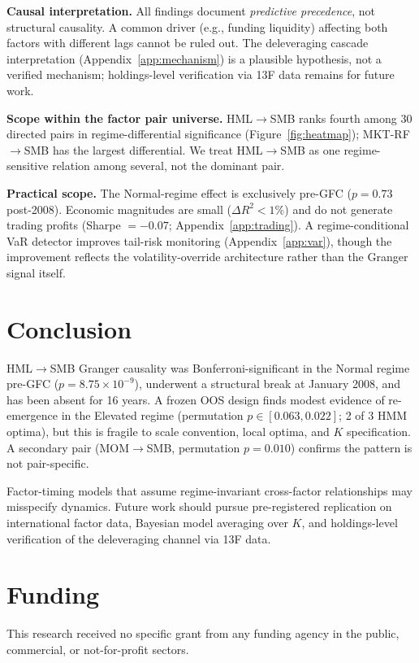 \documentclass[sigconf,anonymous]{acmart}
\begin{document}
\textbf{Causal interpretation.}
All findings document \emph{predictive precedence}, not structural causality.
A common driver (e.g., funding liquidity) affecting both factors with different
lags cannot be ruled out. The deleveraging cascade interpretation
(Appendix~\ref{app:mechanism}) is a plausible hypothesis, not a verified mechanism;
holdings-level verification via 13F data remains for future work.

\textbf{Scope within the factor pair universe.}
HML$\to$SMB ranks fourth among 30 directed pairs in regime-differential
significance (Figure~\ref{fig:heatmap}); MKT-RF$\to$SMB has the largest
differential. We treat HML$\to$SMB as one regime-sensitive relation among several,
not the dominant pair.

\textbf{Practical scope.}
The Normal-regime effect is exclusively pre-GFC ($p = 0.73$ post-2008).
Economic magnitudes are small ($\Delta R^2 < 1\%$) and do not generate trading
profits (Sharpe $= -0.07$; Appendix~\ref{app:trading}). A regime-conditional
VaR detector improves tail-risk monitoring (Appendix~\ref{app:var}), though the
improvement reflects the volatility-override architecture rather than the
Granger signal itself.

\section{Conclusion}

HML$\to$SMB Granger causality was Bonferroni-significant in the Normal regime
pre-GFC ($p = 8.75 \times 10^{-9}$), underwent a structural break at
January 2008, and has been absent for 16 years. A frozen OOS design finds
modest evidence of re-emergence in the Elevated regime (permutation
$p \in [0.063, 0.022]$; 2 of 3 HMM optima), but this is fragile to scale
convention, local optima, and $K$ specification. A secondary pair
(MOM$\to$SMB, permutation $p = 0.010$) confirms the pattern is not
pair-specific.

Factor-timing models that assume regime-invariant cross-factor relationships
may misspecify dynamics. Future work should pursue pre-registered replication
on international factor data, Bayesian model averaging over $K$, and
holdings-level verification of the deleveraging channel via 13F data.

\section*{Funding}

This research received no specific grant from any funding agency in the public,
commercial, or not-for-profit sectors.
\end{document}
